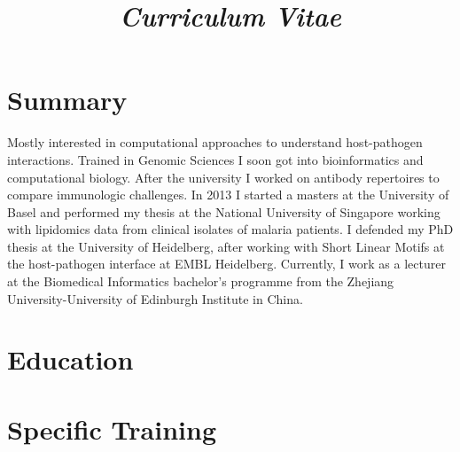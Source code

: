 \documentclass[11pt,a4paper,sans]{moderncv} %
\title{\emph{Curriculum Vitae}}
\begin{document}
\makecvtitle %
\vspace{-1.2cm}
\section{Summary}
Mostly interested in computational approaches to understand host-pathogen interactions. Trained in Genomic Sciences I soon got into bioinformatics and computational biology. After the university I worked on antibody repertoires to compare immunologic challenges. In 2013 I started a masters at the University of Basel and performed my thesis at the National University of Singapore working with lipidomics data from clinical isolates of malaria patients. I defended my PhD thesis at the University of Heidelberg, after working with Short Linear Motifs at the host-pathogen interface at EMBL Heidelberg. Currently, I work as a lecturer at the Biomedical Informatics bachelor's programme from the Zhejiang University-University of Edinburgh Institute in China.

\section{Education}


\section{Specific Training}


\end{document}
